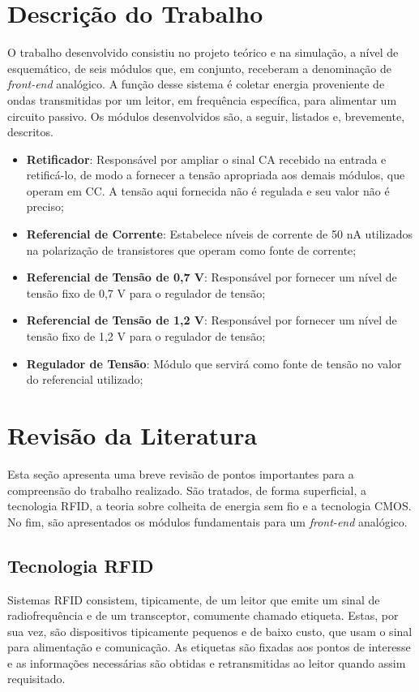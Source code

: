 \section{Descrição do Trabalho}
O trabalho desenvolvido consistiu no projeto teórico e na simulação, a nível de esquemático, de seis módulos que, em conjunto, receberam a denominação de \textit{front-end} analógico. A função desse sistema é coletar energia proveniente de ondas transmitidas por um leitor, em frequência específica, para alimentar um circuito passivo. Os módulos desenvolvidos são, a seguir, listados e, brevemente, descritos.

\begin{itemize}
	\item \textbf{Retificador}: Responsável por ampliar o sinal CA recebido na entrada e retificá-lo, de modo a fornecer a tensão apropriada aos demais módulos, que operam em CC. A tensão aqui fornecida não é regulada e seu valor não é preciso;
	\item \textbf{Referencial de Corrente}: Estabelece níveis de corrente de 50 nA utilizados na polarização de transistores que operam como fonte de corrente;
	\item \textbf{Referencial de Tensão de 0,7 V}: Responsável por fornecer um nível de tensão fixo de 0,7 V para o regulador de tensão;
	\item \textbf{Referencial de Tensão de 1,2 V}: Responsável por fornecer um nível de tensão fixo de 1,2 V para o regulador de tensão;
	\item \textbf{Regulador de Tensão}: Módulo que servirá como fonte de tensão no valor do referencial utilizado;
\end{itemize}


\section{Revisão da Literatura}
Esta seção apresenta uma breve revisão de pontos importantes para a compreensão do trabalho realizado. São tratados, de forma superficial, a tecnologia {RFID}, a teoria sobre colheita de energia sem fio e a tecnologia {CMOS}. No fim, são apresentados os módulos fundamentais para um \textit{front-end} analógico.

\subsection{Tecnologia RFID}
Sistemas RFID consistem, tipicamente, de um leitor que emite um sinal de radiofrequência e de um transceptor, comumente chamado etiqueta. Estas, por sua vez, são dispositivos tipicamente pequenos e de baixo custo, que usam o sinal para alimentação e comunicação. As etiquetas são fixadas aos pontos de interesse e as informações necessárias são obtidas e retransmitidas ao leitor quando assim requisitado.

